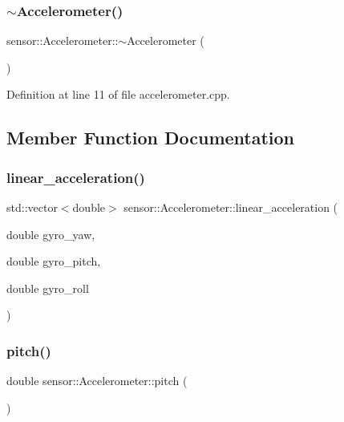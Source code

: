 \subsubsection{\texorpdfstring{$\sim$\+Accelerometer()}{~Accelerometer()}}
{\footnotesize\ttfamily sensor\+::\+Accelerometer\+::$\sim$\+Accelerometer (\begin{DoxyParamCaption}{ }\end{DoxyParamCaption})}



Definition at line 11 of file accelerometer.\+cpp.



\subsection{Member Function Documentation}
\mbox{\label{classsensor_1_1_accelerometer_a53257e59c7db9c75f3df41039d5b5b6d}} 
\subsubsection{\texorpdfstring{linear\+\_\+acceleration()}{linear\_acceleration()}}
{\footnotesize\ttfamily std\+::vector$<$double$>$ sensor\+::\+Accelerometer\+::linear\+\_\+acceleration (\begin{DoxyParamCaption}\item[{double}]{gyro\+\_\+yaw,  }\item[{double}]{gyro\+\_\+pitch,  }\item[{double}]{gyro\+\_\+roll }\end{DoxyParamCaption})}

\mbox{\label{classsensor_1_1_accelerometer_afd2bf373d1142b305cc16c9020ae01e8}} 
\subsubsection{\texorpdfstring{pitch()}{pitch()}}
{\footnotesize\ttfamily double sensor\+::\+Accelerometer\+::pitch (\begin{DoxyParamCaption}{ }\end{DoxyParamCaption})}



